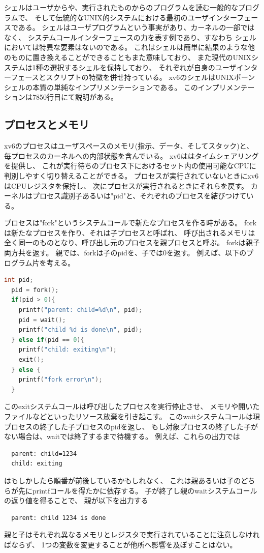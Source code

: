 \documentclass[11pt,a4paper, uplatex]{jsarticle}
\begin{document}
シェルはユーザからや、実行されたものからのプログラムを読む一般的なプログラムで、
そして伝統的なUNIX的システムにおける最初のユーザインターフェースである。
シェルはユーザプログラムという事実があり、カーネルの一部ではなく、
システムコールインターフェースの力を表す例であり、すなわち
シェルにおいては特異な要素はないのである。
これはシェルは簡単に結果のような他のものに置き換えることができることもまた意味しており、
また現代のUNIXシステムは1種の選択するシェルを保持しており、
それぞれが自身のユーザインターフェースとスクリプトの特徴を併せ持っている。
xv6のシェルはUNIXボーンシェルの本質の単純なインプリメンテーションである。
このインプリメンテーションは7850行目にて説明がある。

\subsection{プロセスとメモリ}
xv6のプロセスはユーザスペースのメモリ(指示、データ、そしてスタック)と、
毎プロセスのカーネルへの内部状態を含んでいる。
xv6ははタイムシェアリングを提供し、
これが実行待ちのプロセス下におけるセット内の使用可能なCPUに判別しやすく切り替えることができる。
プロセスが実行されていないときにxv6はCPUレジスタを保持し、
次にプロセスが実行されるときにそれらを戻す。
カーネルはプロセス識別子あるいは"pid"と、それぞれのプロセスを結びつけている。

プロセスは"fork"というシステムコールで新たなプロセスを作る時がある。
forkは新たなプロセスを作り、それは子プロセスと呼ばれ、
呼び出されるメモリは全く同一のものとなり、呼び出し元のプロセスを親プロセスと呼ぶ。
forkは親子両方共を返す。
親では、forkは子のpidを、子では0を返す。
例えば、以下のプログラム片を考える。
\begin{lstlisting}[language=c]
  int pid;
  pid = fork();
  if(pid > 0){
    printf("parent: child=%d\n", pid);
    pid = wait();
    printf("child %d is done\n", pid);
  } else if(pid == 0){
    printf("child: exiting\n");
    exit();
  } else {
    printf("fork error\n");
  }
\end{lstlisting}
このexitシステムコールは呼び出したプロセスを実行停止させ、
メモリや開いたファイルなどといったリソース放棄を引き起こす。
このwaitシステムコールは現プロセスの終了した子プロセスのpidを返し、
もし対象プロセスの終了した子がない場合は、waitでは終了するまで待機する。
例えば、これらの出力では
\begin{lstlisting}
  parent: child=1234
  child: exiting
\end{lstlisting}
はもしかしたら順番が前後しているかもしれなく、
これは親あるいは子のどちらが先にprintfコールを得たかに依存する。
子が終了し親のwaitシステムコールの返り値を得ることで、
親が以下を出力する
\begin{lstlisting}
  parent: child 1234 is done
\end{lstlisting}
親と子はそれぞれ異なるメモリとレジスタで実行されていることに注意しなければならず、
1つの変数を変更することが他所へ影響を及ぼすことはない。
\end{document}
